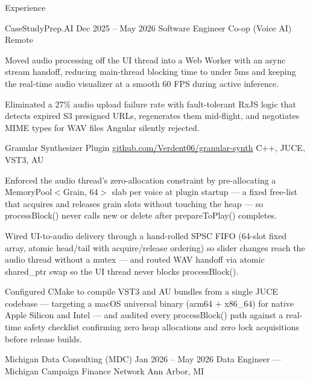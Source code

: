 \documentclass[
	11pt
]{../../../template}
\begin{document}
	\begin{rSection}{E}{xperience}
		\begin{rSectionEntry}
			{CaseStudyPrep.AI}
			{Dec 2025 -- May 2026}
			{Software Engineer Co-op (Voice AI)}
			{}
			{Remote}

			\item Moved audio processing off the UI thread into a Web Worker with an async stream handoff, reducing main-thread blocking time to under 5ms and keeping the real-time audio visualizer at a smooth 60 FPS during active inference.
			\item Eliminated a 27\% audio upload failure rate with fault-tolerant RxJS logic that detects expired S3 presigned URLs, regenerates them mid-flight, and negotiates MIME types for WAV files Angular silently rejected.
		\end{rSectionEntry}

		\begin{rSectionEntry}
			{Granular Synthesizer Plugin}
			{\href{https://github.com/Verdent06/granular-synth}{github.com/Verdent06/granular-synth}}
			{}
			{C++, JUCE, VST3, AU}
			{}

			\item Enforced the audio thread's zero-allocation constraint by pre-allocating a MemoryPool$<$Grain, 64$>$ slab per voice at plugin startup --- a fixed free-list that acquires and releases grain slots without touching the heap --- so processBlock() never calls new or delete after prepareToPlay() completes.
			\item Wired UI-to-audio delivery through a hand-rolled SPSC FIFO (64-slot fixed array, atomic head/tail with acquire/release ordering) so slider changes reach the audio thread without a mutex --- and routed WAV handoff via atomic shared\_ptr swap so the UI thread never blocks processBlock().
			\item Configured CMake to compile VST3 and AU bundles from a single JUCE codebase --- targeting a macOS universal binary (arm64 + x86\_64) for native Apple Silicon and Intel --- and audited every processBlock() path against a real-time safety checklist confirming zero heap allocations and zero lock acquisitions before release builds.
		\end{rSectionEntry}

		\begin{rSectionEntry}
			{Michigan Data Consulting (MDC)}
			{Jan 2026 -- May 2026}
			{Data Engineer --- Michigan Campaign Finance Network}
			{}
			{Ann Arbor, MI}


\end{rSectionEntry}
\end{rSection}
\end{document}
